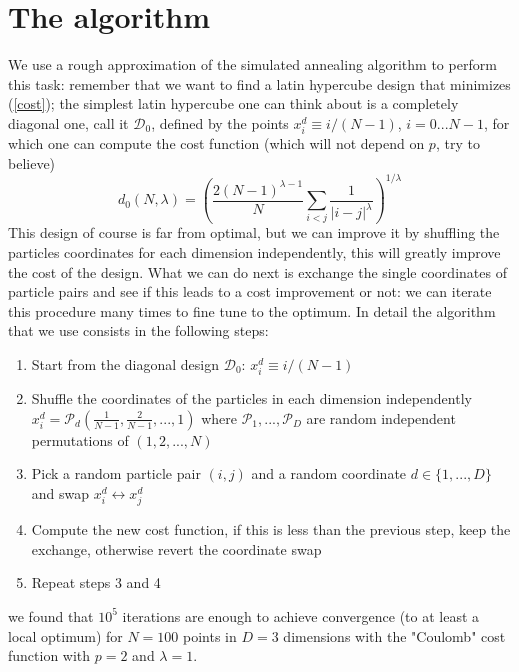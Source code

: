 \documentclass[11pt]{article}
\begin{document}
\section*{The algorithm}
We use a rough approximation of the simulated annealing algorithm to perform this task: remember that we want to find a latin hypercube design that minimizes (\ref{cost}); the simplest latin hypercube one can think about is a completely diagonal one, call it $\mathcal{D}_0$, defined by the points $x_i^d\equiv i/(N-1)$, $i=0...N-1$, for which one can compute the cost function (which will not depend on $p$, try to believe)
\begin{equation}
\label{diagonalcost}
d_0(N,\lambda) = \left(\frac{2(N-1)^{\lambda-1}}{N}\sum_{i<j}\frac{1}{\vert i-j\vert^\lambda}\right)^{1/\lambda}
\end{equation}
%
This design of course is far from optimal, but we can improve it by shuffling the particles coordinates for each dimension independently, this will greatly improve the cost of the design. What we can do next is exchange the single coordinates of particle pairs and see if this leads to a cost improvement or not: we can iterate this procedure many times to fine tune to the optimum. In detail the algorithm that we use consists in the following steps:
\begin{enumerate}
\item Start from the diagonal design $\mathcal{D}_0$: $x_i^d\equiv i/(N-1)$
\item Shuffle the coordinates of the particles in each dimension independently $x_i^d = \mathcal{P}_d\left(\frac{1}{N-1},\frac{2}{N-1},...,1\right)$ where $\mathcal{P}_1,...,\mathcal{P}_D$ are random independent permutations of $(1,2,...,N)$
\item Pick a random particle pair $(i,j)$ and a random coordinate $d\in\{1,...,D\}$ and swap $x_i^d\leftrightarrow x_j^d$
\item Compute the new cost function, if this is less than the previous step, keep the exchange, otherwise revert the coordinate swap
\item Repeat steps 3 and 4 
\end{enumerate}
%
we found that $10^5$ iterations are enough to achieve convergence (to at least a local optimum) for $N=100$ points in $D=3$ dimensions with the "Coulomb" cost function with $p=2$ and $\lambda=1$.  
\end{document}
